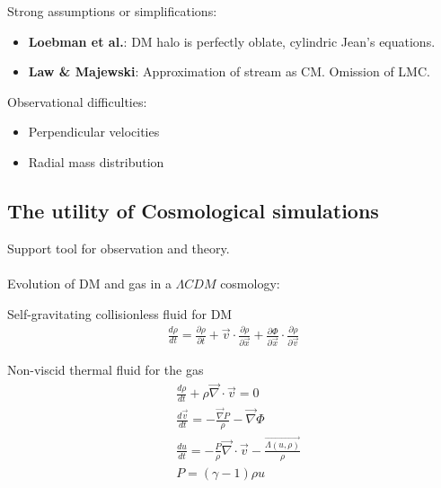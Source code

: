 \documentclass[xcolor=dvipsnames]{beamer}
\begin{document}
\begin{frame}
Strong assumptions or simplifications:

\begin{itemize}
\item \textbf{Loebman et al.}: DM halo is perfectly oblate, cylindric Jean's equations.

\item \textbf{Law \& Majewski}: Approximation of stream as CM. Omission of LMC.
\end{itemize}

Observational difficulties:

\begin{itemize}
\item Perpendicular velocities

\item Radial mass distribution
\end{itemize}

\end{frame}

\subsection{The utility of Cosmological simulations}

\begin{frame}

Support tool for observation and theory.\\~\\

Evolution of DM and gas in a $\Lambda CDM$ cosmology:

\begin{block}{Self-gravitating collisionless fluid for DM}
\tiny
\begin{align}
\frac{d\rho}{dt} = \frac{\partial \rho}{\partial t} +\vec{v}\cdot\frac{\partial\rho}{\partial \vec{x}}
+\frac{\partial \Phi}{\partial \vec{x}}\cdot\frac{\partial\rho}{\partial \vec{v}}
\end{align}
\end{block}

\begin{block}{Non-viscid thermal fluid for the gas}
\tiny
\begin{align}
&\frac{d\rho}{dt} + \rho \vec{\nabla}\cdot\vec{v} = 0\\
&\frac{d\vec{v}}{dt} = -\frac{\vec{\nabla}P}{\rho} - \vec{\nabla} \Phi \\
&\frac{du}{dt} = -\frac{P}{\rho}\vec{\nabla}\cdot\vec{v} - \frac{\vec{\Lambda(u,\rho)}}{\rho}\\
& P = (\gamma -1 )\rho u
\end{align}
\end{block}
\end{frame}
\end{document}
